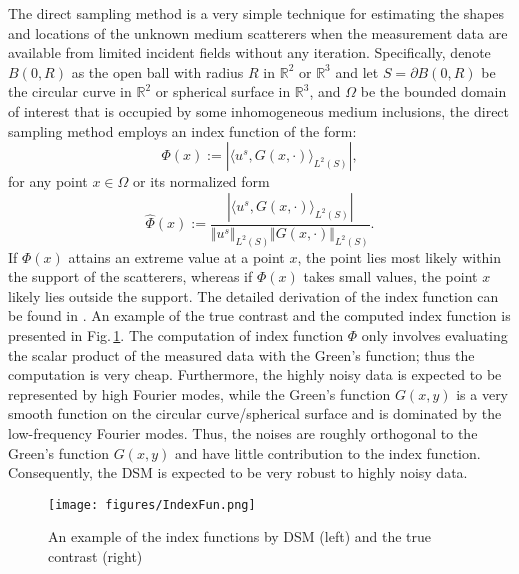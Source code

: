 \documentclass{article}
\begin{document}
	The direct sampling method\cite{ito2012direct} is a very simple technique for estimating the shapes and locations of the unknown medium scatterers when the measurement data are available from limited incident fields without any iteration. Specifically, denote $B(0,R)$ as the open ball with radius $R$ in $\mathbb{R}^2$ or $\mathbb{R}^3$ and let $S=\partial B(0,R)$ be the circular curve in $\mathbb{R}^{2}$ or spherical surface in $\mathbb{R}^{3}$, and $\Omega$ be the bounded domain of interest that is occupied by some inhomogeneous medium inclusions, the direct sampling method employs an index function of the form:
	\begin{equation}
 		\Phi(x):=|\langle u^{s},G(x,\cdot)\rangle_{L^{2}(S)}|
		\label{indexfunction},
	\end{equation}
	for any point $x\in \Omega$ or its normalized form
	\begin{equation}
		\hat{\Phi}(x):=\dfrac{|\langle u^{s},G(x,\cdot)\rangle_{L^{2}(S)}|}{\Vert u^{s}\Vert_{L^{2}(S)}\Vert G(x,\cdot) \Vert_{L^{2}(S)} }.
		\label{norIndex}
	\end{equation}
	If $\Phi(x)$ attains an extreme value at a point $x$, the point lies most likely within the support of the scatterers, whereas if $\Phi(x)$ takes small values, the point $x$ likely lies outside the support. The detailed derivation of the index function can be found in \cite{ito2012direct}.  An example of the true contrast and the computed index function is presented in Fig.\,\ref{fig:IndFun}. The computation of index function $\Phi$ only involves evaluating the scalar product of the measured data with the Green's function; thus the computation is very cheap. Furthermore, the highly noisy data is expected to be represented by high Fourier modes, while the Green's function $G(x,y)$ is a very smooth function on the circular curve/spherical surface and is dominated by the low-frequency Fourier modes. Thus, the noises are roughly orthogonal to the Green's function $G(x,y)$ and have little contribution to the index function. Consequently, the DSM is expected to be very robust to highly noisy data. 
	\begin{figure}[htp]
		\centering
		\texttt{[image: figures/IndexFun.png]}
		\caption{An example of the index functions by DSM (left) and the true contrast (right)}
		\label{fig:IndFun}
	\end{figure}
\end{document}
